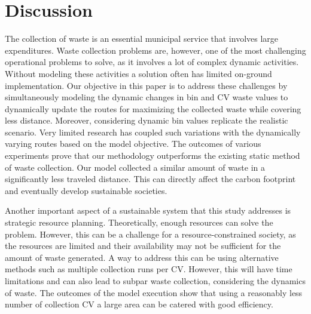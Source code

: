 \documentclass[12pt]{article}
\begin{document}





\section{Discussion}

The collection of waste is an essential municipal service that involves large expenditures. Waste collection problems are, however, one of the most challenging operational problems to solve, as it involves a lot of complex dynamic activities. Without modeling these activities a solution often has limited on-ground implementation. Our objective in this paper is to address these challenges by simultaneously modeling the dynamic changes in bin and CV waste values to dynamically update the routes for maximizing the collected waste while covering less distance. Moreover, considering dynamic bin values replicate the realistic scenario. Very limited research has coupled such variations with the dynamically varying routes based on the model objective. The outcomes of various experiments prove that our methodology outperforms the existing static method of waste collection. Our model collected a similar amount of waste in a significantly less traveled distance. This can directly affect the carbon footprint and eventually develop sustainable societies.

Another important aspect of a sustainable system that this study addresses is strategic resource planning. Theoretically, enough resources can solve the problem. However, this can be a challenge for a resource-constrained society, as the resources are limited and their availability may not be sufficient for the amount of waste generated. A way to address this can be using alternative methods such as multiple collection runs per CV. However, this will have time limitations and can also lead to subpar waste collection, considering the dynamics of waste. The outcomes of the model execution show that using a reasonably less number of collection CV a large area can be catered with good efficiency.
\end{document}
